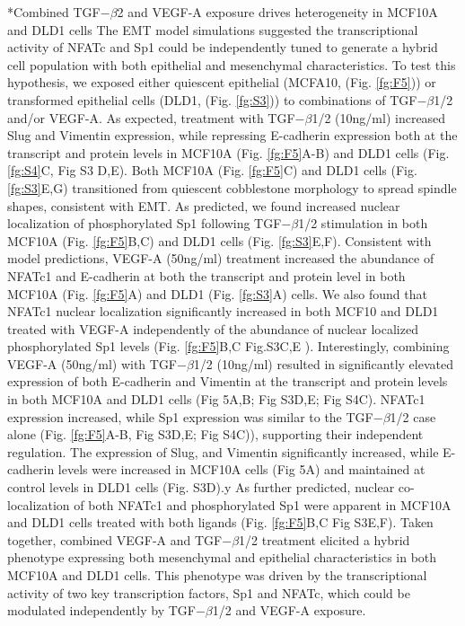 \documentclass[12pt]{article}
\makeatletter
\renewcommand\subsection{\@startsection
	{subsection}{2}{0mm}
	{-0.05in}
	{-0.5\baselineskip}
	{\normalfont\normalsize\bfseries}}
\makeatother
\begin{document}
\subsection*{Combined TGF$-\beta$2 and VEGF-A exposure drives heterogeneity in MCF10A and DLD1 cells}
The EMT model simulations suggested the transcriptional activity of NFATc and Sp1 could be independently tuned to generate a hybrid cell population with both epithelial and mesenchymal characteristics.
To test this hypothesis, we exposed either quiescent epithelial (MCFA10, (Fig. \ref{fg:F5})) or transformed epithelial cells (DLD1, (Fig. \ref{fg:S3})) to combinations of TGF$-\beta$1/2 and/or VEGF-A. As expected, treatment with TGF$-\beta$1/2 (10ng/ml) increased Slug and Vimentin expression, while repressing E-cadherin expression both at the transcript and protein levels in MCF10A (Fig. \ref{fg:F5}A-B) and DLD1 cells (Fig. \ref{fg:S4}C, Fig S3 D,E).
Both MCF10A (Fig. \ref{fg:F5}C) and DLD1 cells (Fig. \ref{fg:S3}E,G) transitioned from quiescent cobblestone morphology to spread spindle shapes, consistent with EMT.
As predicted, we found increased nuclear localization of phosphorylated Sp1 following TGF$-\beta$1/2 stimulation in both MCF10A (Fig. \ref{fg:F5}B,C) and DLD1 cells (Fig. \ref{fg:S3}E,F).
Consistent with model predictions, VEGF-A (50ng/ml) treatment increased the abundance of NFATc1 and E-cadherin at both the transcript and protein level in both MCF10A (Fig. \ref{fg:F5}A) and DLD1 (Fig. \ref{fg:S3}A) cells.
We also found that NFATc1 nuclear localization significantly increased in both MCF10 and DLD1 treated with VEGF-A independently of the abundance of nuclear localized phosphorylated Sp1 levels (Fig. \ref{fg:F5}B,C Fig.S3C,E ).
Interestingly, combining VEGF-A (50ng/ml) with TGF$-\beta$1/2 (10ng/ml) resulted in significantly elevated expression of both E-cadherin and Vimentin at the transcript and protein levels in both MCF10A and DLD1 cells (Fig 5A,B; Fig S3D,E; Fig S4C).
NFATc1 expression increased, while Sp1 expression was similar to the TGF$-\beta$1/2 case alone (Fig. \ref{fg:F5}A-B,  Fig S3D,E; Fig S4C)), supporting their independent regulation.
The expression of Slug, and Vimentin significantly increased, while E-cadherin levels were increased in MCF10A cells (Fig 5A) and maintained at control levels in DLD1 cells (Fig. S3D).y
As further predicted, nuclear co-localization of both NFATc1 and phosphorylated Sp1 were apparent in MCF10A and DLD1 cells treated with both ligands (Fig. \ref{fg:F5}B,C Fig S3E,F).
Taken together, combined VEGF-A and TGF$-\beta$1/2 treatment elicited a hybrid phenotype expressing both mesenchymal and epithelial characteristics in both MCF10A and DLD1 cells.
This phenotype was driven by the transcriptional activity of two key transcription factors, Sp1 and NFATc, which could be modulated independently by TGF$-\beta$1/2 and VEGF-A exposure.
\end{document}
